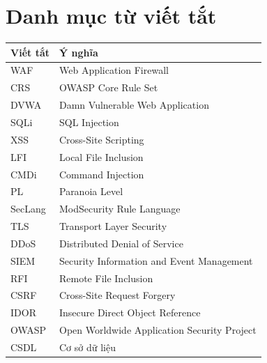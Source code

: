 \documentclass[a4paper,oneside]{report}
\begin{document}


\tableofcontents
\clearpage
\chapter*{Danh mục từ viết tắt}
\begin{tabularx}{\linewidth}{@{}lX@{}}
\toprule
\textbf{Viết tắt} & \textbf{Ý nghĩa} \\ \midrule
WAF & Web Application Firewall \\
CRS & OWASP Core Rule Set \\
DVWA & Damn Vulnerable Web Application \\
SQLi & SQL Injection \\
XSS & Cross-Site Scripting \\
LFI & Local File Inclusion \\
CMDi & Command Injection \\
PL & Paranoia Level \\
SecLang & ModSecurity Rule Language \\
TLS & Transport Layer Security \\
DDoS & Distributed Denial of Service \\
SIEM & Security Information and Event Management \\
RFI & Remote File Inclusion \\
CSRF & Cross-Site Request Forgery \\
IDOR & Insecure Direct Object Reference \\
OWASP & Open Worldwide Application Security Project \\
CSDL & Cơ sở dữ liệu \\
\bottomrule
\end{tabularx}

\clearpage
{}








\printbibliography[heading=bibintoc,title={TÀI LIỆU THAM KHẢO}]
\end{document}
